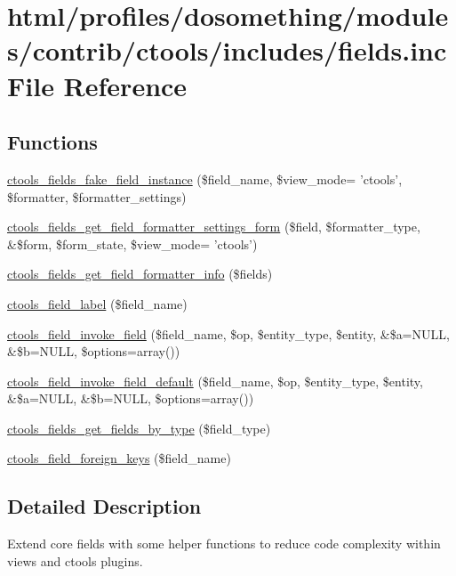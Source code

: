 \hypertarget{fields_8inc}{
\section{html/profiles/dosomething/modules/contrib/ctools/includes/fields.inc File Reference}
\label{fields_8inc}
}
\subsection*{Functions}
\begin{DoxyCompactItemize}
\item 
\hyperlink{fields_8inc_ac6854ba7959279ea2513224ed3375628}{ctools\_\-fields\_\-fake\_\-field\_\-instance} (\$field\_\-name, \$view\_\-mode= 'ctools', \$formatter, \$formatter\_\-settings)
\item 
\hyperlink{fields_8inc_a73335c2fc8c4ac79f671d1b7a8033a10}{ctools\_\-fields\_\-get\_\-field\_\-formatter\_\-settings\_\-form} (\$field, \$formatter\_\-type, \&\$form, \$form\_\-state, \$view\_\-mode= 'ctools')
\item 
\hyperlink{fields_8inc_a178ae8d6cf7ee3d40a388b1c3e09f896}{ctools\_\-fields\_\-get\_\-field\_\-formatter\_\-info} (\$fields)
\item 
\hyperlink{fields_8inc_a56fdb1540ed0662e97789fc89cec1365}{ctools\_\-field\_\-label} (\$field\_\-name)
\item 
\hyperlink{fields_8inc_a109d8f80825dc8d999859e0d580ca8e5}{ctools\_\-field\_\-invoke\_\-field} (\$field\_\-name, \$op, \$entity\_\-type, \$entity, \&\$a=NULL, \&\$b=NULL, \$options=array())
\item 
\hyperlink{fields_8inc_a0c7f122d4f06bf0276adccf59a47d6f4}{ctools\_\-field\_\-invoke\_\-field\_\-default} (\$field\_\-name, \$op, \$entity\_\-type, \$entity, \&\$a=NULL, \&\$b=NULL, \$options=array())
\item 
\hyperlink{fields_8inc_a008f62d9ea68df7c92397fee45e5bf50}{ctools\_\-fields\_\-get\_\-fields\_\-by\_\-type} (\$field\_\-type)
\item 
\hyperlink{fields_8inc_a714c68e6faaf2f4918d726fb580e920e}{ctools\_\-field\_\-foreign\_\-keys} (\$field\_\-name)
\end{DoxyCompactItemize}


\subsection{Detailed Description}
Extend core fields with some helper functions to reduce code complexity within views and ctools plugins. 

